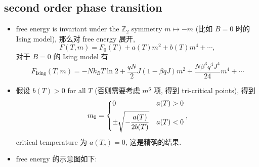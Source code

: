 \subsection{second order phase transition}
\begin{itemize}
	\item free energy is invariant under the $\mathbb{Z}_2$ symmetry $m \mapsto - m$ (比如 $B = 0$ 时的 Ising model), 那么对 free energy 展开,
	\begin{equation} \label{11.5.3}
		F(T, m) = F_0(T) + a(T) m^2 + b(T) m^4 + \cdots,
	\end{equation}
	对于 $B = 0$ 的 Ising model 有
	\begin{equation}
		F_\text{Ising}(T, m) = - N k_B T \ln 2 + \frac{q N}{2} J (1 - \beta q J) m^2 + \frac{N \beta^3 q^4 J^4}{24} m^4 + \cdots
	\end{equation}
	
	\item 假设 $b(T) > 0$ for all $T$ (否则需要考虑 $m^6$ 项, 得到 tri-critical points), 得到
	\begin{equation} \label{11.5.5}
		m_0 = \begin{dcases}
			0 & a(T) > 0 \\
			\pm \sqrt{- \frac{a(T)}{2 b(T)}} & a(T) < 0
		\end{dcases},
	\end{equation}
	critical temperature 为 $a(T_c) = 0$, 这是精确的结果.
	
	\item free energy 的示意图如下:
	

\end{itemize}
